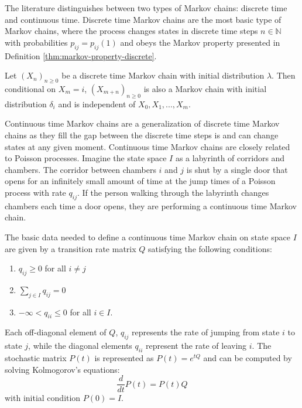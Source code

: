 The literature distinguishes between two types of Markov chains: discrete time and continuous time.
Discrete time Markov chains are the most basic type of Markov chains, where the process
changes states in discrete time steps $n \in \mathbb{N}$ with probabilities $p_{ij} = p_{ij}(1)$
and obeys the Markov property presented in Definition \ref{thm:markov-property-discrete}.

\begin{defn}
\label{thm:markov-property-discrete}
Let $(X_n)_{n \ge 0}$ be a discrete time Markov chain with initial distribution $\lambda$.
Then conditional on $X_m = i$, $(X_{m + n})_{n \ge 0}$ is also a Markov chain with initial
distribution $\delta_i$ and is independent of $X_0, X_1, ..., X_m$.
\end{defn}

Continuous time Markov chains are a generalization of discrete time Markov chains as they
fill the gap between the discrete time steps is and can change states at any given moment.
Continuous time Markov chains are closely related to Poisson processes. Imagine the state
space $I$ as a labyrinth of corridors and chambers. The corridor between chambers $i$ and $j$
is shut by a single door that opens for an infinitely small amount of time at the jump times of
a Poisson process with rate $q_{ij}$. If the person walking through the labyrinth changes
chambers each time a door opens, they are performing
a continuous time Markov chain.

The basic data needed to define a continuous time Markov chain on state space $I$ are
given by a transition rate matrix $Q$ satisfying the following conditions:

\begin{enumerate}
	\item $q_{ij} \ge 0$ for all $i \ne j$
	\item $\sum_{j \in I} q_{ij} = 0$
	\item $-\infty < q_{ii} \le 0$ for all $i \in I$.
\end{enumerate}

Each off-diagonal element of $Q$, $q_{ij}$ represents the rate of jumping from state $i$ to state $j$,
while the diagonal elements $q_{ii}$ represent the rate of leaving $i$. The stochastic matrix
$P(t)$ is represented as $P(t) = e^{tQ}$ and can be computed by solving Kolmogorov's equations:
\begin{equation}
	\nonumber
	\frac{d}{dt}P(t) = P(t)Q
\end{equation}
with initial condition $P(0) = I$.

